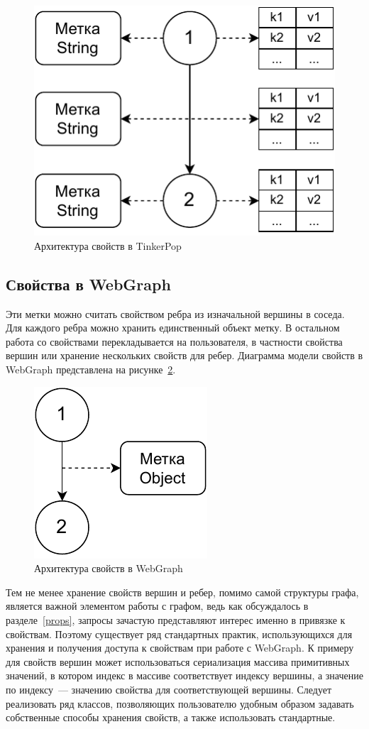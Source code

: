 \documentclass[times,specification,annotation]{itmo-student-thesis}
\begin{document}
\begin{figure}[!h]
\caption{Архитектура свойств в TinkerPop}\label{fig2}
\centering
\includegraphics{img/tinker-props.pdf}
\end{figure}

\subsection{Свойства в WebGraph}\label{sec:webgraph-props}

Эти метки можно считать свойством ребра из изначальной вершины в соседа. Для каждого ребра можно хранить единственный объект метку. В остальном работа со свойствами перекладывается на пользователя, в частности свойства вершин или хранение нескольких свойств для ребер. Диаграмма модели свойств в WebGraph представлена на рисунке~\ref{fig3}.

\begin{figure}[!h]
\caption{Архитектура свойств в WebGraph}\label{fig3}
\centering
\includegraphics{img/webgraph-props.pdf}
\end{figure}

Тем не менее хранение свойств вершин и ребер, помимо самой структуры графа, является важной элементом работы с графом, ведь как обсуждалось в разделе~\ref{props}, запросы зачастую представляют интерес именно в привязке к свойствам. Поэтому существует ряд стандартных практик, использующихся для хранения и получения доступа к свойствам при работе с WebGraph.
К примеру для свойств вершин может использоваться сериализация массива примитивных значений, в котором индекс в массиве соответствует индексу вершины, а значение по индексу~--- значению свойства для соответствующей вершины. Следует реализовать ряд классов, позволяющих пользователю удобным образом задавать собственные способы хранения свойств, а также использовать стандартные.
\end{document}
